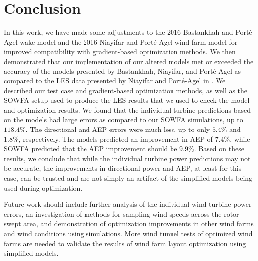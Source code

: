 \documentclass[conf]{new-aiaa}
\begin{document}
\section{Conclusion}
In this work, we have made some adjustments to the 2016 Bastankhah and Port\'{e}-Agel wake model and the 2016 Niayifar and Port\'{e}-Agel wind farm model for improved compatibility with gradient-based optimization methods. We then demonstrated that our implementation of our altered models met or exceeded the accuracy of the models presented by Bastankhah, Niayifar, and Port\'{e}-Agel as compared to the LES data presented by Niayifar and Port\'{e}-Agel in \cite{niayifar2016}. We described our test case and gradient-based optimization methods, as well as the SOWFA setup used to produce the LES results that we used to check the model and optimization results. We found that the individual turbine predictions based on the models had large errors as compared to our SOWFA simulations, up to $118.4\%$. The directional and AEP errors were much less, up to only $5.4\%$ and $1.8\%$, respectively. The models predicted an improvement in AEP of $7.4\%$, while SOWFA predicted that the AEP improvement should be $9.9\%$. Based on these results, we conclude that while the individual turbine power predictions may not be accurate, the improvements in directional power and AEP, at least for this case, can be trusted and are not simply an artifact of the simplified models being used during optimization.

Future work should include further analysis of the individual wind turbine power errors, an investigation of methods for sampling wind speeds across the rotor-swept area, and demonstration of optimization improvements in other wind farms and wind conditions using simulations. More wind tunnel tests of optimized wind farms are needed to validate the results of wind farm layout optimization using simplified models.



\end{document}
